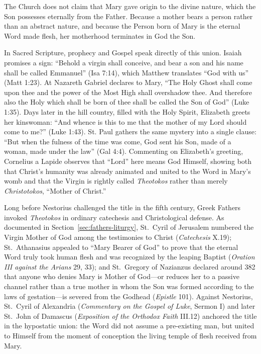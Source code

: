 The Church does not claim that Mary gave origin to the divine nature, which the Son possesses eternally from the Father. Because a mother bears a person rather than an abstract nature, and because the Person born of Mary is the eternal Word made flesh, her motherhood terminates in God the Son.

In Sacred Scripture, prophecy and Gospel speak directly of this union. Isaiah promises a sign: ``Behold a virgin shall conceive, and bear a son and his name shall be called Emmanuel'' (Isa 7:14), which Matthew translates ``God with us'' (Matt 1:23). At Nazareth Gabriel declares to Mary, ``The Holy Ghost shall come upon thee and the power of the Most High shall overshadow thee. And therefore also the Holy which shall be born of thee shall be called the Son of God'' (Luke 1:35). Days later in the hill country, filled with the Holy Spirit, Elizabeth greets her kinswoman: ``And whence is this to me that the mother of my Lord should come to me?'' (Luke 1:43). St. Paul gathers the same mystery into a single clause: ``But when the fulness of the time was come, God sent his Son, made of a woman, made under the law'' (Gal 4:4). Commenting on Elizabeth's greeting, Cornelius a Lapide observes that ``Lord'' here means God Himself, showing both that Christ's humanity was already animated and united to the Word in Mary's womb and that the Virgin is rightly called \textit{Theotokos} rather than merely \textit{Christotokos}, ``Mother of Christ.''

Long before Nestorius challenged the title in the fifth century, Greek Fathers invoked \textit{Theotokos} in ordinary catechesis and Christological defense. As documented in Section~\ref{sec:fathers-liturgy}, St.\ Cyril of Jerusalem numbered the Virgin Mother of God among the testimonies to Christ (\textit{Catechesis} X.19); St.\ Athanasius appealed to ``Mary Bearer of God'' to prove that the eternal Word truly took human flesh and was recognized by the leaping Baptist (\textit{Oration III against the Arians} 29, 33); and St.\ Gregory of Nazianzus declared around 382 that anyone who denies Mary is Mother of God---or reduces her to a passive channel rather than a true mother in whom the Son was formed according to the laws of gestation---is severed from the Godhead (\textit{Epistle} 101). Against Nestorius, St.\ Cyril of Alexandria (\textit{Commentary on the Gospel of Luke}, Sermon I) and later St.\ John of Damascus (\textit{Exposition of the Orthodox Faith} III.12) anchored the title in the hypostatic union: the Word did not assume a pre-existing man, but united to Himself from the moment of conception the living temple of flesh received from Mary.

